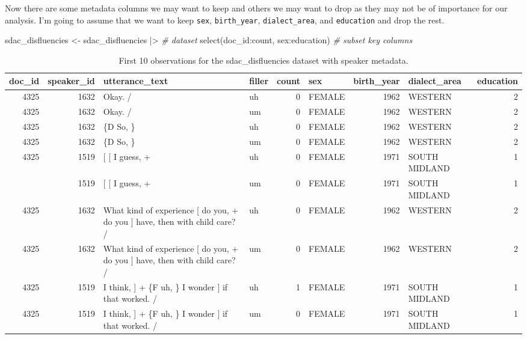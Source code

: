 \documentclass[
  letterpaper,
]{scrbook}
\newenvironment{Shaded}{\begin{snugshade}}{\end{snugshade}}
\newcommand{\CommentTok}[1]{\textcolor[rgb]{0.00,0.00,0.00}{\textit{#1}}}
\newcommand{\FunctionTok}[1]{\textcolor[rgb]{0.00,0.00,0.00}{#1}}
\newcommand{\NormalTok}[1]{\textcolor[rgb]{0.00,0.00,0.00}{#1}}
\newcommand{\OtherTok}[1]{\textcolor[rgb]{0.00,0.00,0.00}{#1}}
\newcommand{\SpecialCharTok}[1]{\textcolor[rgb]{0.00,0.00,0.00}{#1}}
\begin{document}
Now there are some metadata columns we may want to keep and others we
may want to drop as they may not be of importance for our analysis. I'm
going to assume that we want to keep \texttt{sex}, \texttt{birth\_year},
\texttt{dialect\_area}, and \texttt{education} and drop the rest.

\begin{Shaded}
\begin{Highlighting}[]
\NormalTok{sdac\_disfluencies }\OtherTok{\textless{}{-}} 
\NormalTok{  sdac\_disfluencies }\SpecialCharTok{|\textgreater{}} \CommentTok{\# dataset}
  \FunctionTok{select}\NormalTok{(doc\_id}\SpecialCharTok{:}\NormalTok{count, sex}\SpecialCharTok{:}\NormalTok{education) }\CommentTok{\# subset key columns}
\end{Highlighting}
\end{Shaded}

\hypertarget{tbl-td-sdac-disfluencies-meta-preview}{}
\begin{table}
\caption{\label{tbl-td-sdac-disfluencies-meta-preview}First 10 observations for the sdac\_disfluencies dataset with speaker
metadata. }\tabularnewline

\centering
\begin{tabular}{rrllrlrlr}
\toprule
doc\_id & speaker\_id & utterance\_text & filler & count & sex & birth\_year & dialect\_area & education\\
\midrule
4325 & 1632 & Okay.  / & uh & 0 & FEMALE & 1962 & WESTERN & 2\\
4325 & 1632 & Okay.  / & um & 0 & FEMALE & 1962 & WESTERN & 2\\
4325 & 1632 & \{D So, \} & uh & 0 & FEMALE & 1962 & WESTERN & 2\\
4325 & 1632 & \{D So, \} & um & 0 & FEMALE & 1962 & WESTERN & 2\\
4325 & 1519 & {}[ [ I guess, + & uh & 0 & FEMALE & 1971 & SOUTH MIDLAND & 1\\
\addlinespace
4325 & 1519 & {}[ [ I guess, + & um & 0 & FEMALE & 1971 & SOUTH MIDLAND & 1\\
4325 & 1632 & What kind of experience [ do you, + do you ] have, then with child care? / & uh & 0 & FEMALE & 1962 & WESTERN & 2\\
4325 & 1632 & What kind of experience [ do you, + do you ] have, then with child care? / & um & 0 & FEMALE & 1962 & WESTERN & 2\\
4325 & 1519 & I think, ] + \{F uh, \} I wonder ] if that worked. / & uh & 1 & FEMALE & 1971 & SOUTH MIDLAND & 1\\
4325 & 1519 & I think, ] + \{F uh, \} I wonder ] if that worked. / & um & 0 & FEMALE & 1971 & SOUTH MIDLAND & 1\\
\bottomrule
\end{tabular}
\end{table}
\end{document}
